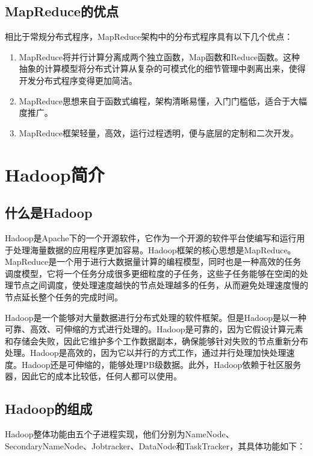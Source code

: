\subsection{MapReduce的优点}
相比于常规分布式程序，MapReduce架构中的分布式程序具有以下几个优点：
\begin{enumerate}

\item MapReduce将并行计算分离成两个独立函数，Map函数和Reduce函数。这种抽象的计算模型将分布式计算从复杂的可模式化的细节管理中剥离出来，使得开发分布式程序变得更加简洁。

\item MapReduce思想来自于函数式编程，架构清晰易懂，入门门槛低，适合于大幅度推广。

\item MapReduce框架轻量，高效，运行过程透明，便与底层的定制和二次开发。

\end{enumerate}


\section{Hadoop简介}

\subsection{什么是Hadoop}
Hadoop是Apache下的一个开源软件，它作为一个开源的软件平台使编写和运行用于处理海量数据的应用程序更加容易。Hadoop框架的核心思想是MapReduce。MapReduce是一个用于进行大数据量计算的编程模型，同时也是一种高效的任务调度模型，它将一个任务分成很多更细粒度的子任务，这些子任务能够在空闺的处理节点之间调度，使处理速度越快的节点处理越多的任务，从而避免处理速度慢的节点延长整个任务的完成时间。

Hadoop是一个能够对大量数据进行分布式处理的软件框架。但是Hadoop是以一种可靠、高效、可伸缩的方式进行处理的。Hadoop是可靠的，因为它假设计算元素和存储会失败，因此它维护多个工作数据副本，确保能够针对失败的节点重新分布处理。Hadoop是高效的，因为它以并行的方式工作，通过并行处理加快处理速度。Hadoop还是可伸缩的，能够处理PB级数据。此外，Hadoop依赖于社区服务器，因此它的成本比较低，任何人都可以使用。

\subsection{Hadoop的组成}
Hadoop整体功能由五个子进程实现，他们分别为NameNode、SecondaryNameNode、Jobtracker、DataNode和TaskTracker，其具体功能如下：

